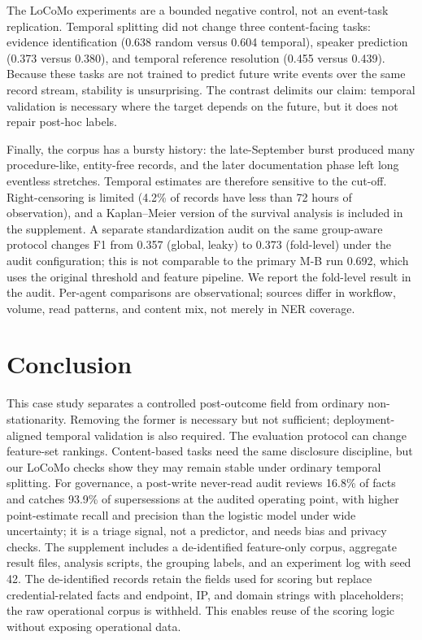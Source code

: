 \documentclass[sigconf,nonacm]{acmart}
\begin{document}
The LoCoMo experiments are a bounded negative control, not an event-task replication. Temporal splitting did not change three content-facing tasks: evidence identification (0.638 random versus 0.604 temporal), speaker prediction (0.373 versus 0.380), and temporal reference resolution (0.455 versus 0.439). Because these tasks are not trained to predict future write events over the same record stream, stability is unsurprising. The contrast delimits our claim: temporal validation is necessary where the target depends on the future, but it does not repair post-hoc labels.

Finally, the corpus has a bursty history: the late-September burst produced many procedure-like, entity-free records, and the later documentation phase left long eventless stretches. Temporal estimates are therefore sensitive to the cut-off. Right-censoring is limited (4.2\% of records have less than 72 hours of observation), and a Kaplan--Meier version of the survival analysis is included in the supplement. A separate standardization audit on the same group-aware protocol changes F1 from 0.357 (global, leaky) to 0.373 (fold-level) under the audit configuration; this is not comparable to the primary M-B run 0.692, which uses the original threshold and feature pipeline. We report the fold-level result in the audit. Per-agent comparisons are observational; sources differ in workflow, volume, read patterns, and content mix, not merely in NER coverage.

\section{Conclusion}
This case study separates a controlled post-outcome field from ordinary non-stationarity. Removing the former is necessary but not sufficient; deployment-aligned temporal validation is also required. The evaluation protocol can change feature-set rankings. Content-based tasks need the same disclosure discipline, but our LoCoMo checks show they may remain stable under ordinary temporal splitting. For governance, a post-write never-read audit reviews 16.8\% of facts and catches 93.9\% of supersessions at the audited operating point, with higher point-estimate recall and precision than the logistic model under wide uncertainty; it is a triage signal, not a predictor, and needs bias and privacy checks. The supplement includes a de-identified feature-only corpus, aggregate result files, analysis scripts, the grouping labels, and an experiment log with seed 42. The de-identified records retain the fields used for scoring but replace credential-related facts and endpoint, IP, and domain strings with placeholders; the raw operational corpus is withheld. This enables reuse of the scoring logic without exposing operational data.
\end{document}
